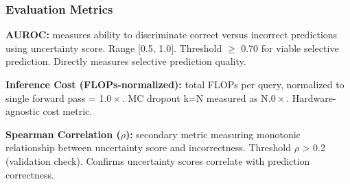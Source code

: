 \subsubsection{Evaluation Metrics}

\textbf{AUROC:} measures ability to discriminate correct versus incorrect predictions using uncertainty score. Range [0.5, 1.0]. Threshold $\geq$ 0.70 for viable selective prediction. Directly measures selective prediction quality.

\textbf{Inference Cost (FLOPs-normalized):} total FLOPs per query, normalized to single forward pass = 1.$0\times$. MC dropout k=N measured as N.$0\times$. Hardware-agnostic cost metric.

\textbf{Spearman Correlation ($\rho$):} secondary metric measuring monotonic relationship between uncertainty score and incorrectness. Threshold $\rho$ > 0.2 (validation check). Confirms uncertainty scores correlate with prediction correctness.
